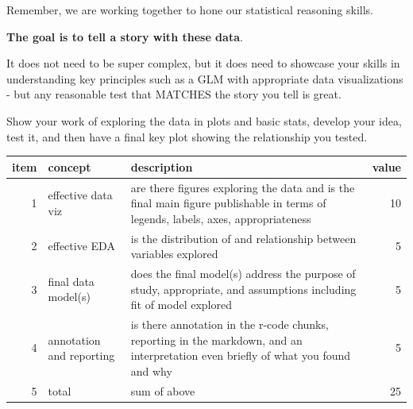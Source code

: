 \documentclass[
]{book}
\begin{document}
Remember, we are working together to hone our statistical reasoning skills.

\textbf{The goal is to tell a story with these data}.

It does not need to be super complex, but it does need to showcase your skills in understanding key principles such as a GLM with appropriate data visualizations - but any reasonable test that MATCHES the story you tell is great.

Show your work of exploring the data in plots and basic stats, develop your idea, test it, and then have a final key plot showing the relationship you tested.

\begin{tabular}{rllr}
\toprule
item & concept & description & value\\
\midrule
1 & effective data viz & are there figures exploring the data and is the final main figure publishable in terms of legends, labels, axes, appropriateness & 10\\
2 & effective EDA & is the distribution of and relationship between variables explored & 5\\
3 & final data model(s) & does the final model(s) address the purpose of study, appropriate, and assumptions including  fit of model explored & 5\\
4 & annotation and reporting & is there annotation in the r-code chunks, reporting in the markdown, and an interpretation even briefly of what you found and why & 5\\
5 & total & sum of above & 25\\
\bottomrule
\end{tabular}

  
\end{document}
